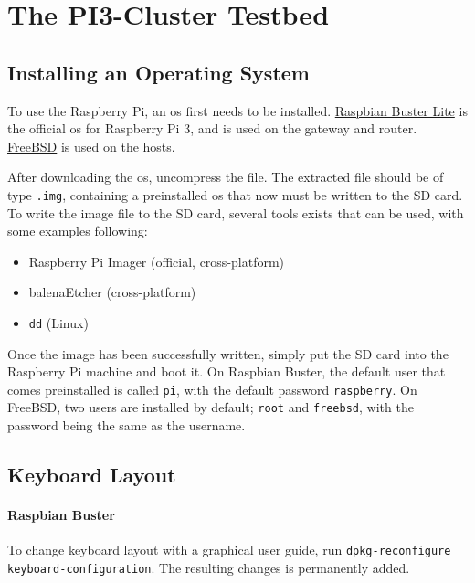 \chapter{The PI3-Cluster Testbed}

\section{Installing an Operating System} \label{install_os}

To use the Raspberry Pi, an \gls{os} first needs to be installed. \href{https://www.raspberrypi.org/downloads/raspbian/}{Raspbian Buster Lite} is the official \gls{os} for Raspberry Pi 3, and is used on the gateway and router. \href{https://www.freebsd.org/}{FreeBSD} is used on the hosts.

After downloading the \gls{os}, uncompress the file. The extracted file should be of type \lstinline{.img}, containing a preinstalled \gls{os} that now must be written to the SD card. To write the image file to the SD card, several tools exists that can be used, with some examples following:

\begin{itemize}
    \item Raspberry Pi Imager (official, cross-platform)
    \item balenaEtcher (cross-platform)
    \item \lstinline{dd} (Linux)
\end{itemize}

Once the image has been successfully written, simply put the SD card into the Raspberry Pi machine and boot it. On Raspbian Buster, the default user that comes preinstalled is called \lstinline{pi}, with the default password \lstinline{raspberry}. On FreeBSD, two users are installed by default; \lstinline{root} and \lstinline{freebsd}, with the password being the same as the username.


\section{Keyboard Layout} \label{keyboard_layout}

\subsubsection{Raspbian Buster}

To change keyboard layout with a graphical user guide, run \lstinline{dpkg-reconfigure keyboard-configuration}. The resulting changes is permanently added.

